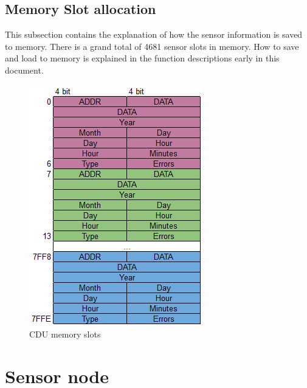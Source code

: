 \subsection{Memory Slot allocation}
This subsection contains the explanation of how the sensor information is saved to memory. There is a grand total of 4681 sensor slots in memory. How to save and load to memory is explained in the function descriptions early in this document.
\begin{figure}[H]
\centering
\includegraphics[scale=1]{billeder/memoryslots}
\caption{CDU memory slots}
\label{fig:memoryslots}
\end{figure}

\section{Sensor node}